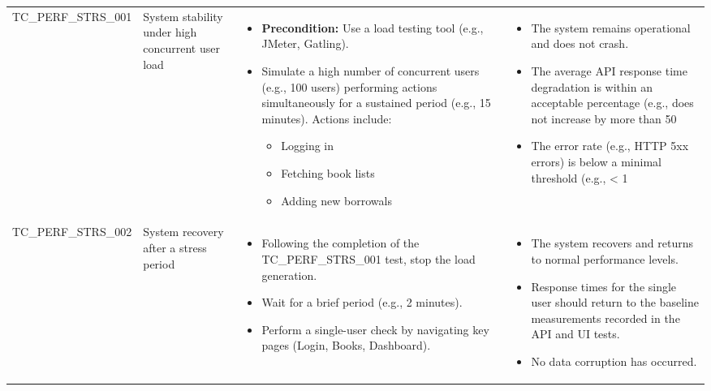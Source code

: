 \begin{longtable}{|>{\scriptsize\raggedright\arraybackslash}p{3.5cm}|>{\raggedright\arraybackslash}p{3cm}|>{\raggedright\arraybackslash}p{4cm}|>{\raggedright\arraybackslash}p{4.5cm}|}
\multicolumn{4}{|l|}{\textbf{Sub-Section: Stress Testing}} \\ \hline
TC\_PERF\_STRS\_001 & System stability under high concurrent user load & 
    \begin{itemize}[noitemsep, topsep=0pt, partopsep=0pt, leftmargin=*]
        \item \textbf{Precondition:} Use a load testing tool (e.g., JMeter, Gatling).
        \item Simulate a high number of concurrent users (e.g., 100 users) performing actions simultaneously for a sustained period (e.g., 15 minutes). Actions include:
        \begin{itemize}
            \item Logging in
            \item Fetching book lists
            \item Adding new borrowals
        \end{itemize}
    \end{itemize} & 
    \begin{itemize}[noitemsep, topsep=0pt, partopsep=0pt, leftmargin=*]
        \item The system remains operational and does not crash.
        \item The average API response time degradation is within an acceptable percentage (e.g., does not increase by more than 50%
        \item The error rate (e.g., HTTP 5xx errors) is below a minimal threshold (e.g., < 1%
    \end{itemize} \\ \hline
TC\_PERF\_STRS\_002 & System recovery after a stress period & 
    \begin{itemize}[noitemsep, topsep=0pt, partopsep=0pt, leftmargin=*]
        \item Following the completion of the TC\_PERF\_STRS\_001 test, stop the load generation.
        \item Wait for a brief period (e.g., 2 minutes).
        \item Perform a single-user check by navigating key pages (Login, Books, Dashboard).
    \end{itemize} & 
    \begin{itemize}[noitemsep, topsep=0pt, partopsep=0pt, leftmargin=*]
        \item The system recovers and returns to normal performance levels.
        \item Response times for the single user should return to the baseline measurements recorded in the API and UI tests.
        \item No data corruption has occurred.
    \end{itemize} \\ \hline

\end{longtable}